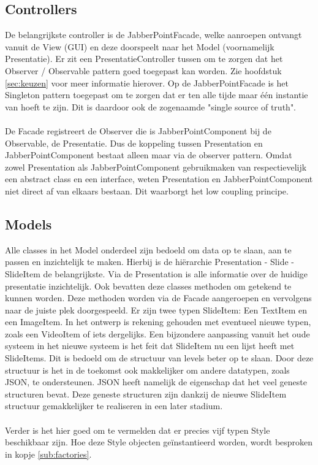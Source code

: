 \documentclass[a4paper]{article}
\newcommand{\1}[0]{\'{e}\'{e}n}
\begin{document}
\subsection{Controllers}
De belangrijkste controller is de JabberPointFacade, welke aanroepen ontvangt vanuit de View (GUI) en deze doorspeelt naar het Model (voornamelijk Presentatie). Er zit een PresentatieController tussen om te zorgen dat het Observer / Observable pattern goed toegepast kan worden. Zie hoofdstuk \ref{sec:keuzen} voor meer informatie hierover. Op de JabberPointFacade is het Singleton pattern toegepast om te zorgen dat er ten alle tijde maar \1 instantie van hoeft te zijn. Dit is daardoor ook de zogenaamde "single source of truth".
\\\\
De Facade registreert de Observer die is JabberPointComponent bij de Observable, de Presentatie. Dus de koppeling tussen Presentation en JabberPointComponent bestaat alleen maar via de observer pattern. Omdat zowel Presentation als JabberPointComponent gebruikmaken van respectievelijk een abstract class en een interface, weten Presentation en JabberPointComponent niet direct af van elkaars bestaan. Dit waarborgt het low coupling principe.

\subsection{Models}
Alle classes in het Model onderdeel zijn bedoeld om data op te slaan, aan te passen en inzichtelijk te maken. Hierbij is de hi\"{e}rarchie Presentation - Slide - SlideItem de belangrijkste. Via de Presentation is alle informatie over de huidige presentatie inzichtelijk. Ook bevatten deze classes methoden om getekend te kunnen worden. Deze methoden worden via de Facade aangeroepen en vervolgens naar de juiste plek doorgespeeld. Er zijn twee typen SlideItem: Een TextItem en een ImageItem. In het ontwerp is rekening gehouden met eventueel nieuwe typen, zoals een VideoItem of iets dergelijks. Een bijzondere aanpassing vanuit het oude systeem in het nieuwe systeem is het feit dat SlideItem nu een lijst heeft met SlideItems. Dit is bedoeld om de structuur van levels beter op te slaan. Door deze structuur is het in de toekomst ook makkelijker om andere datatypen, zoals JSON, te ondersteunen. JSON heeft namelijk de eigenschap dat het veel geneste structuren bevat. Deze geneste structuren zijn dankzij de nieuwe SlideItem structuur gemakkelijker te realiseren in een later stadium.
\\\\
Verder is het hier goed om te vermelden dat er precies vijf typen Style beschikbaar zijn. Hoe deze Style objecten ge\"{i}nstantieerd worden, wordt besproken in kopje \ref{sub:factories}.
\end{document}
